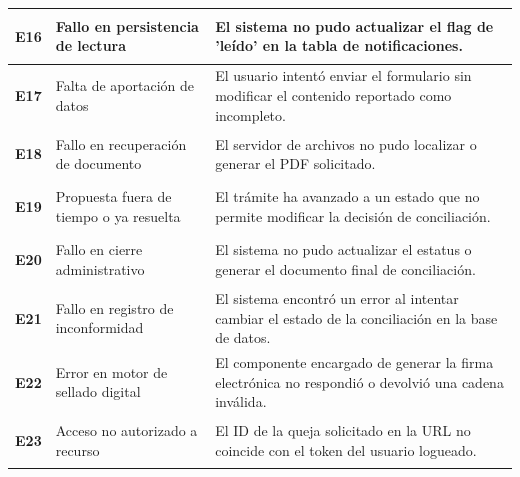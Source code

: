 \begin{longtable}{|p{2cm}|p{6cm}|p{6cm}|}
    \hypertarget{err:E16}{\textbf{E16}} & Fallo en persistencia de lectura & El sistema no pudo actualizar el flag de 'leído' en la tabla de notificaciones. \\ \hline
    \hypertarget{err:E17}{\textbf{E17}} & Falta de aportación de datos & El usuario intentó enviar el formulario sin modificar el contenido reportado como incompleto. \\ \hline
    \hypertarget{err:E18}{\textbf{E18}} & Fallo en recuperación de documento & El servidor de archivos no pudo localizar o generar el PDF solicitado. \\ \hline
    \hypertarget{err:E19}{\textbf{E19}} & Propuesta fuera de tiempo o ya resuelta & El trámite ha avanzado a un estado que no permite modificar la decisión de conciliación. \\ \hline
    \hypertarget{err:E20}{\textbf{E20}} & Fallo en cierre administrativo & El sistema no pudo actualizar el estatus o generar el documento final de conciliación. \\ \hline
    \hypertarget{err:E21}{\textbf{E21}} & Fallo en registro de inconformidad & El sistema encontró un error al intentar cambiar el estado de la conciliación en la base de datos. \\ \hline
    \hypertarget{err:E22}{\textbf{E22}} & Error en motor de sellado digital & El componente encargado de generar la firma electrónica no respondió o devolvió una cadena inválida. \\ \hline
    \hypertarget{err:E23}{\textbf{E23}} & Acceso no autorizado a recurso & El ID de la queja solicitado en la URL no coincide con el token del usuario logueado. \\ \hline

\end{longtable}